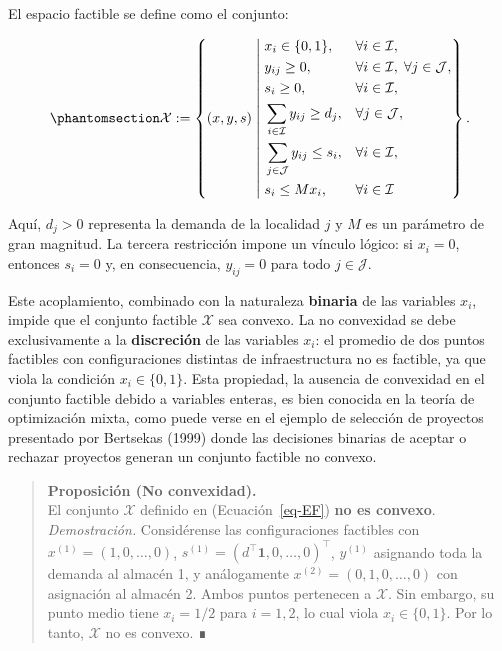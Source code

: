 \documentclass[
  spanish,
  us-letterpaper,
]{scrreprt}
\numberwithin{equation}{section}
\begin{document}
El espacio factible se define como el conjunto:

\begin{equation}\phantomsection\label{eq-EF}{
\mathcal{X} := \left\{ (x, y, s) \;\middle|\;
\begin{aligned}
& x_i \in \{0,1\}, && \forall i \in \mathcal{I}, \\
& y_{ij} \ge 0,    && \forall i \in \mathcal{I},\; \forall j \in \mathcal{J}, \\
& s_i \ge 0,       && \forall i \in \mathcal{I}, \\
& \sum_{i \in \mathcal{I}} y_{ij} \ge d_j, && \forall j \in \mathcal{J}, \\
& \sum_{j \in \mathcal{J}} y_{ij} \le s_i, && \forall i \in \mathcal{I}, \\
& s_i \le M x_i,   && \forall i \in \mathcal{I}
\end{aligned}
\right\}.
}\end{equation}

Aquí, \(d_j > 0\) representa la demanda de la localidad \(j\) y \(M\) es
un parámetro de gran magnitud. La tercera restricción impone un vínculo
lógico: si \(x_i = 0\), entonces \(s_i = 0\) y, en consecuencia,
\(y_{ij} = 0\) para todo \(j \in \mathcal{J}\).

Este acoplamiento, combinado con la naturaleza \textbf{binaria} de las
variables \(x_i\), impide que el conjunto factible \(\mathcal{X}\) sea
convexo. La no convexidad se debe exclusivamente a la
\textbf{discreción} de las variables \(x_i\): el promedio de dos puntos
factibles con configuraciones distintas de infraestructura no es
factible, ya que viola la condición \(x_i \in \{0,1\}\). Esta propiedad,
la ausencia de convexidad en el conjunto factible debido a variables
enteras, es bien conocida en la teoría de optimización mixta, como puede
verse en el ejemplo de selección de proyectos presentado por Bertsekas
(1999) donde las decisiones binarias de aceptar o rechazar proyectos
generan un conjunto factible no convexo.

\begin{quote}
\textbf{Proposición (No convexidad).}\\
El conjunto \(\mathcal{X}\) definido en (Ecuación~\ref{eq-EF})
\textbf{no es convexo}.\\
\emph{Demostración.} Considérense las configuraciones factibles con
\(x^{(1)} = (1,0,\dots,0)\),
\(s^{(1)} = (d^\top \mathbf{1}, 0, \dots, 0)^\top\), \(y^{(1)}\)
asignando toda la demanda al almacén 1, y análogamente
\(x^{(2)} = (0,1,0,\dots,0)\) con asignación al almacén 2. Ambos puntos
pertenecen a \(\mathcal{X}\). Sin embargo, su punto medio tiene
\(x_i = 1/2\) para \(i=1,2\), lo cual viola \(x_i \in \{0,1\}\). Por lo
tanto, \(\mathcal{X}\) no es convexo. ∎
\end{quote}
\end{document}
